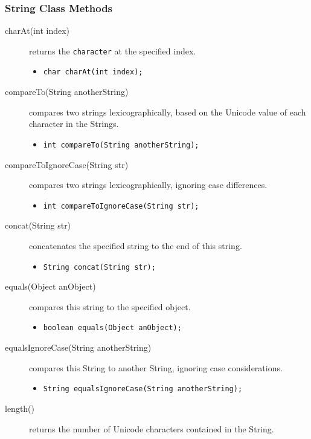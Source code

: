\documentclass[11pt,a4paper]{article}
\begin{document}
\subsubsection*{String Class Methods}
\begin{description}
\item [charAt(int index)] returns the \texttt{character} at the specified index.

\begin{itemize}
\item \lstinline!char charAt(int index);!
\end{itemize}

\item [compareTo(String anotherString)] compares two strings lexicographically, based on the Unicode value of each character in the Strings.

\begin{itemize}
\item \lstinline!int compareTo(String anotherString);!
\end{itemize}
\item [compareToIgnoreCase(String str)] compares two strings lexicographically, ignoring case differences.

\begin{itemize}
\item \lstinline!int compareToIgnoreCase(String str);!
\end{itemize}
\item [concat(String str)] concatenates the specified string to the end of this string.

\begin{itemize}
\item \lstinline!String concat(String str);!
\end{itemize}
\item [equals(Object anObject)] compares this string to the specified object.

\begin{itemize}
\item \lstinline!boolean equals(Object anObject);!
\end{itemize}
\item [equalsIgnoreCase(String anotherString)] compares this String to another String, ignoring case considerations.

\begin{itemize}
\item \lstinline!String equalsIgnoreCase(String anotherString);!
\end{itemize}
\item [length()] returns the number of Unicode characters contained in the String.


\end{description}
\end{document}

